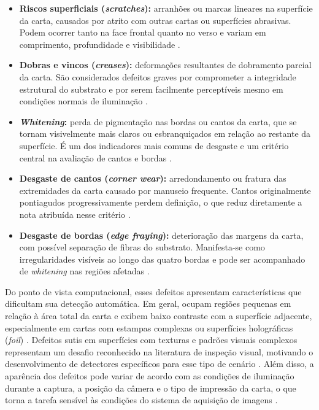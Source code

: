 \documentclass[
    12pt,                %
    openright,           %
    oneside,             %
    a4paper,             %
    english,             %
    brazil               %
]{abntex2}
\begin{document}
\begin{itemize}
    \item \textbf{Riscos superficiais (\textit{scratches}):}
    arranhões ou marcas lineares na superfície da carta, causados
    por atrito com outras cartas ou superfícies abrasivas. Podem
    ocorrer tanto na face frontal quanto no verso e variam em
    comprimento, profundidade e visibilidade \cite{Nahar2025}.

    \item \textbf{Dobras e vincos (\textit{creases}):}
    deformações resultantes de dobramento parcial da carta.
    São considerados defeitos graves por comprometer a
    integridade estrutural do substrato e por serem facilmente
    perceptíveis mesmo em condições normais de iluminação
    \cite{Nahar2025}.

    \item \textbf{\textit{Whitening}:} perda de pigmentação nas
    bordas ou cantos da carta, que se tornam visivelmente mais
    claros ou esbranquiçados em relação ao restante da superfície.
    É um dos indicadores mais comuns de desgaste e um critério
    central na avaliação de cantos e bordas \cite{Nahar2025}.

    \item \textbf{Desgaste de cantos (\textit{corner wear}):}
    arredondamento ou fratura das extremidades da carta causado
    por manuseio frequente. Cantos originalmente pontiagudos
    progressivamente perdem definição, o que reduz
    diretamente a nota atribuída nesse critério \cite{Nahar2025}.

    \item \textbf{Desgaste de bordas (\textit{edge fraying}):}
    deterioração das margens da carta, com possível separação
    de fibras do substrato. Manifesta-se como irregularidades
    visíveis ao longo das quatro bordas e pode ser acompanhado
    de \textit{whitening} nas regiões afetadas \cite{Nahar2025}.
\end{itemize}

Do ponto de vista computacional, esses defeitos apresentam 
características que dificultam sua detecção automática. Em geral, 
ocupam regiões pequenas em relação à área total da carta e exibem 
baixo contraste com a superfície adjacente, especialmente em cartas 
com estampas complexas ou superfícies holográficas (\textit{foil}) 
\cite{Nahar2025, Chen2021}. Defeitos sutis em superfícies com texturas 
e padrões visuais complexos representam um desafio reconhecido na 
literatura de inspeção visual, motivando o desenvolvimento de detectores 
específicos para esse tipo de cenário \cite{Zhang2023}. Além disso, a 
aparência dos defeitos pode variar de acordo com as condições de 
iluminação durante a captura, a posição da câmera e o tipo de impressão 
da carta, o que torna a tarefa sensível às condições do sistema de 
aquisição de imagens \cite{Zheng2021}.
\end{document}
